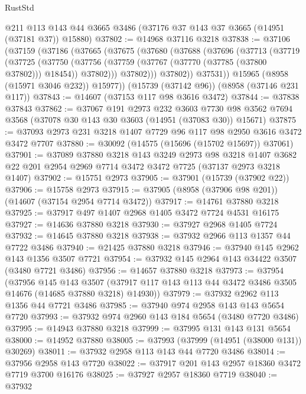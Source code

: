 \begin{lexlean}{RustStd}
\begin{coremodule}
    @211
    @113
    @143
    @44
    @3665
    @3486
    (@37176 @37 @143 @37 @3665 (@14951 (@37181 @37)) @15880)
@37802 := @14968 @37116 @3218
@37838 := @37106
    (@37159
      (@37186
        (@37665
          (@37675
            (@37680
              (@37688
                (@37696
                  (@37713
                    (@37719
                      (@37725
                        (@37750
                          (@37756
                            (@37759 (@37767 (@37770 (@37785 (@37800 @37802))) @18454))
                            @37802)))
                      @37802)))
                @37802))
            @37531))
        @15965
        (@8958 (@15971 @3046 @232))
        @15977))
    (@15739 (@37142 @96))
    (@8958 (@37146 @231 @117))
@37843 := @14607 (@37153 @117 @98 @3616 @3472)
@37844 := @37838 @37843
@37862 := @37067
    @191
    @2973
    @232
    @3603
    @7730
    @98
    @3562
    @7694
    @3568
    (@37078 @30 @143 @30 @3603 (@14951 (@37083 @30)) @15671)
@37875 := @37093 @2973 @231 @3218 @1407 @7729 @96 @117 @98 @2950 @3616 @3472 @3472 @7707
@37880 := @30092 (@14575 (@15696 (@15702 @15697)) @37061)
@37901 := @37089
    @37880
    @3218
    @143
    @3249
    @2973
    @98
    @3218
    @1407
    @3682
    @22
    @201
    @2954
    @2969
    @7714
    @3472
    @3472
    @7725
    (@37137 @2973 @3218 @1407)
@37902 := @15751 @2973
@37905 := @37901 (@15739 (@37902 @22))
@37906 := @15758 @2973
@37915 := @37905 (@8958 (@37906 @98 @201)) (@14607 (@37154 @2954 @7714 @3472))
@37917 := @14761 @37880 @3218
@37925 := @37917 @497 @1407 @2968 @1405 @3472 @7724 @4531 @16175
@37927 := @14636 @37880 @3218
@37930 := @37927 @2968 @1405 @7724
@37932 := @14645 @37880 @3218
@37938 := @37932 @2966 @113 @1357 @44 @7722 @3486
@37940 := @21425 @37880 @3218
@37946 := @37940 @145 @2962 @143 @1356 @3507 @7721
@37954 := @37932 @145 @2964 @143 @34422 @3507 (@3480 @7721 @3486)
@37956 := @14657 @37880 @3218
@37973 := @37954
    (@37956
      @145
      @143
      @3507
      (@37917 @117 @143 @113 @44 @3472 @3486 @3505 @14676 (@14685 @37880 @3218) @14930))
@37979 := @37932 @2962 @113 @1356 @44 @7721 @3486
@37985 := @37940 @974 @2958 @143 @143 @5654 @7720
@37993 := @37932 @974 @2960 @143 @184 @5654 (@3480 @7720 @3486)
@37995 := @14943 @37880 @3218
@37999 := @37995 @131 @143 @131 @5654
@38000 := @14952 @37880
@38005 := @37993 (@37999 (@14951 (@38000 @131)) @30269)
@38011 := @37932 @2958 @113 @143 @44 @7720 @3486
@38014 := @37956 @2958 @143 @7720
@38022 := @37917 @201 @143 @2957 @18360 @3472 @7719 @3700 @16176
@38025 := @37927 @2957 @18360 @7719
@38040 := @37932

\end{coremodule}
\end{lexlean}
